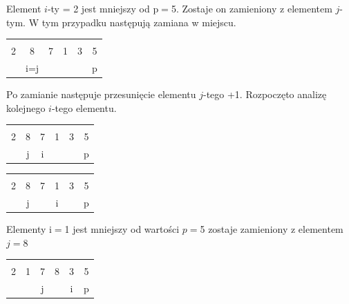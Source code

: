 \documentclass[a4paper,11pt]{report}
\begin{document}
Element $i$-ty = 2 jest mniejszy od p$=$5. Zostaje on zamieniony z elementem $j$-tym. W tym przypadku następują zamiana w miejscu.

\begin{table}[h!]
\Large
\centering
\begin{tabular}{|c|c|c|c|c|c|}
\hline
 &  &  &  &  & \\
2 & 8 & 7 & 1 & 3 & 5 \\ \hdashline
 & i=j & &  &  & p\\ \hline
\end{tabular}

\end{table}

Po zamianie następuje przesunięcie elementu $j$-tego +1. Rozpoczęto analizę kolejnego $i$-tego elementu.

\begin{table}[h!]
\Large
\centering
\begin{tabular}{|c|c|c|c|c|c|}
\hline
 &  &  &  &  & \\
2 & 8 & 7 & 1 & 3 & 5 \\ \hdashline
 & j & i &  &  & p\\ \hline
\end{tabular}

\end{table}

\begin{table}[h!]
\Large
\centering
\begin{tabular}{|c|c|c|c|c|c|}
\hline
 & \cellcolor{black!25} &  & \cellcolor{black!25} &  & \\
2 & \cellcolor{black!25}8 & 7 & \cellcolor{black!25}1 & 3 & 5 \\ \hdashline
 & j &   & i &  & p\\ \hline
\end{tabular}

\end{table}

Elementy i$=$1 jest mniejszy od wartości $p=$5 zostaje zamieniony z elementem $j=$8


\begin{table}[h!]
\Large
\centering
\begin{tabular}{|c|c|c|c|c|c|}
\hline
 &  &\cellcolor{black!25}  &  & \cellcolor{black!25} & \\
2 & 1 & \cellcolor{black!25}7 & 8 & \cellcolor{black!25}3 & 5 \\ \hdashline
 &   & j  &   & i & p\\ \hline
\end{tabular}

\end{table}
\end{document}
